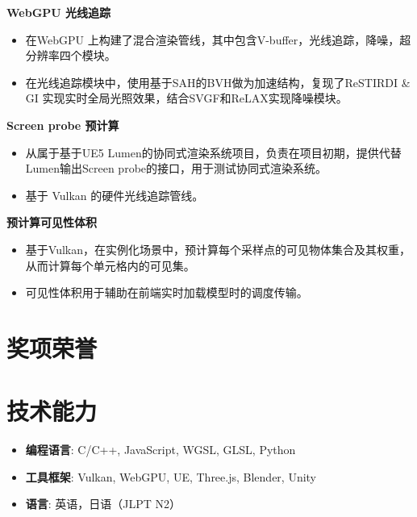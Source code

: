 \documentclass{resume}
\begin{document}

\textbf{WebGPU 光线追踪}
\begin{itemize}
  \item 在WebGPU 上构建了混合渲染管线，其中包含V-buffer，光线追踪，降噪，超分辨率四个模块。
  \item 在光线追踪模块中，使用基于SAH的BVH做为加速结构，复现了ReSTIRDI \& GI 实现实时全局光照效果，结合SVGF和ReLAX实现降噪模块。
\end{itemize}

\textbf{Screen probe 预计算}
\begin{itemize}
  \item 从属于基于UE5 Lumen的协同式渲染系统项目，负责在项目初期，提供代替Lumen输出Screen probe的接口，用于测试协同式渲染系统。
  \item 基于 Vulkan 的硬件光线追踪管线。
\end{itemize}

\textbf{预计算可见性体积}
\begin{itemize}
  \item 基于Vulkan，在实例化场景中，预计算每个采样点的可见物体集合及其权重，从而计算每个单元格内的可见集。
  \item 可见性体积用于辅助在前端实时加载模型时的调度传输。
\end{itemize}

\section{奖项荣誉}
\vspace{12pt}
\section{技术能力}
\begin{itemize}[parsep=0.2ex]
  \item \textbf{编程语言}: C/C++, JavaScript, WGSL, GLSL, Python
  \item \textbf{工具框架}: Vulkan, WebGPU, UE, Three.js, Blender, Unity
  \item \textbf{语言}: 英语，日语（JLPT N2）
\end{itemize}
\end{document}
